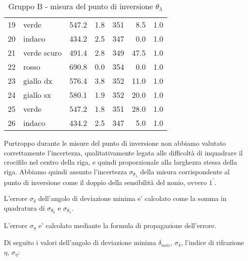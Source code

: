 \begin{table}[!htbp]
{\begin{tabular}{clcccrr}
            19  &   verde        &   547.2  & 1.8 &  351 &   8.5   & 1.0  \\
            20  &   indaco       &   434.2  & 2.5 &  347 &   0.0   & 1.0  \\
            21  &   verde scuro  &   491.4  & 2.8 &  349 &   47.5  & 1.0  \\
            22  &   rosso        &   690.8  & 0.0 &  354 &   0.0   & 1.0  \\
            23  &   giallo dx    &   576.4  & 3.8 &  352 &   11.0  & 1.0  \\
            24  &   giallo sx    &   580.1  & 1.9 &  352 &   20.0  & 1.0  \\
            25  &   verde        &   547.2  & 1.8 &  351 &   28.0  & 1.0  \\
            26  &   indaco       &   434.2  & 2.5 &  347 &   5.0   & 1.0  \\
        \hline
    \end{tabular}
    \par}
    \caption{Gruppo B - misura del punto di inversione $\theta_{\lambda}$}
\end{table}

Purtroppo durante le misure del punto di inversione non abbiamo valutato correttamente l'incertezza, qualitativamente legata alle difficoltà di inquadrare il crocifilo nel centro della riga, e quindi proporzionale alla larghezza stessa della riga.
Abbiamo quindi assunto l'incertezza $\sigma_{\theta_{\lambda}}$ della misura corrispondente al punto di inversione come il doppio della sensibilità del nonio, ovvero $1^{\prime}$. 

L'errore $\sigma_{\delta}$ dell'angolo di deviazione minima e' calcolato come la somma in quadratura di $\sigma_{\theta_0}$ e $\sigma_{\theta_{\lambda}}$.

L'errore $\sigma_{\eta}$ e' calcolato mediante la formula di propagazione dell'errore.

Di seguito i valori dell'angolo di deviazione minima $\delta_{min}$, $\sigma_{\delta}$, l'indice di rifrazione $\eta$, $\sigma_{\eta}$:

